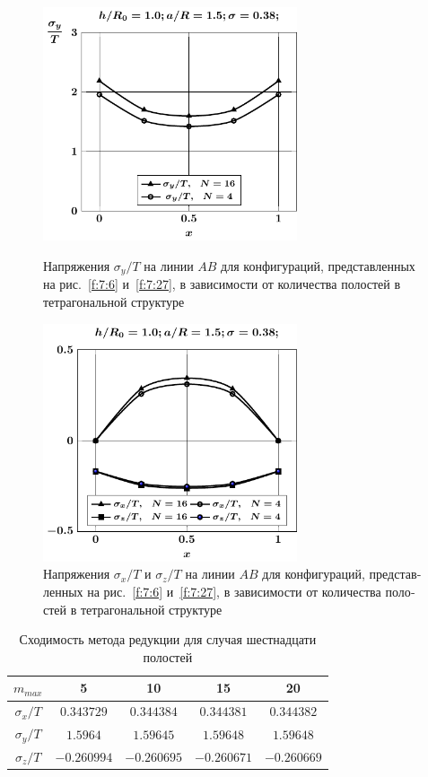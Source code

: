 \begin{russian}
\begin{figure}[h!]
\centering\footnotesize
\parbox[b]{7.5cm}{\centering\includegraphics[width=7.5cm]{cav16-4-sig_y.pdf}
\caption{Напряжения $\sigma_y/T$ на линии $AB$ для конфигураций, представленных на рис.~\ref{f:7:6} и~\ref{f:7:27}, в зависимости от количества полостей в тетрагональной структуре
\label{f:7:32}}}\hfil\hfil
\parbox[b]{7.5cm}{\centering\includegraphics[width=7.5cm]{cav16-4-sig_x_z.pdf}
\caption{Напряжения $\sigma_x/T$ и $\sigma_z/T$ на линии $AB$ для конфигураций, представленных на рис.~\ref{f:7:6} и~\ref{f:7:27}, в зависимости от количества полостей в тетрагональной структуре
\label{f:7:33}}}
\end{figure}

\begin{table}[h!]
\caption{Сходимость метода редукции для случая шестнадцати полостей}
\centering
\begin{tabular}{|c|c|c|c|c|}
\hline
$m_{max}$ & 5 & 10 & 15 & 20 \\
\hline
$\sigma_x/T$ & $0.343729$ & $0.344384$ & $0.344381$ & $0.344382$ \\
\hline
$\sigma_y/T$ & $1.5964$ & $1.59645$ & $1.59648$ & $1.59648$ \\
\hline
$\sigma_z/T$ & $-0.260994$ & $-0.260695$ & $-0.260671$ & $-0.260669$ \\
\hline
\end{tabular}
\label{t:7:5}
\end{table}


\end{russian}
